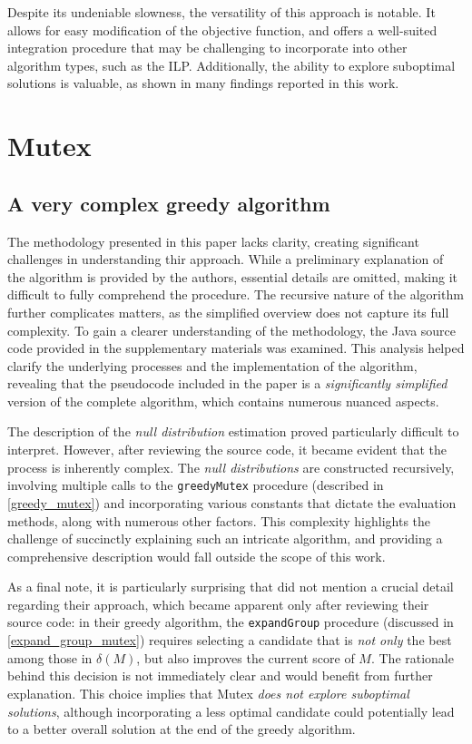 Despite its undeniable slowness, the versatility of this approach is notable. It allows for easy modification of the objective function, and offers a well-suited integration procedure that may be challenging to incorporate into other algorithm types, such as the ILP. Additionally, the ability to explore suboptimal solutions is valuable, as shown in many findings reported in this work.

\section{Mutex}

\subsection{A very complex greedy algorithm}

The methodology presented in this paper lacks clarity, creating significant challenges in understanding thir approach. While a preliminary explanation of the algorithm is provided by the authors, essential details are omitted, making it difficult to fully comprehend the procedure. The recursive nature of the algorithm further complicates matters, as the simplified overview does not capture its full complexity. To gain a clearer understanding of the methodology, the Java source code provided in the supplementary materials was examined. This analysis helped clarify the underlying processes and the implementation of the algorithm, revealing that the pseudocode included in the paper is a \textit{significantly simplified} version of the complete algorithm, which contains numerous nuanced aspects.

The description of the \textit{null distribution} estimation proved particularly difficult to interpret. However, after reviewing the source code, it became evident that the process is inherently complex. The \textit{null distributions} are constructed recursively, involving multiple calls to the \texttt{greedyMutex} procedure (described in \cref{greedy_mutex}) and incorporating various constants that dictate the evaluation methods, along with numerous other factors. This complexity highlights the challenge of succinctly explaining such an intricate algorithm, and providing a comprehensive description would fall outside the scope of this work.

As a final note, it is particularly surprising that \textcite{mutex} did not mention a crucial detail regarding their approach, which became apparent only after reviewing their source code: in their greedy algorithm, the \texttt{expandGroup} procedure (discussed in \cref{expand_group_mutex}) requires selecting a candidate that is \textit{not only} the best among those in $\delta(M)$, but also improves the current score of $M$. The rationale behind this decision is not immediately clear and would benefit from further explanation. This choice implies that Mutex \textit{does not explore suboptimal solutions}, although incorporating a less optimal candidate could potentially lead to a better overall solution at the end of the greedy algorithm.

